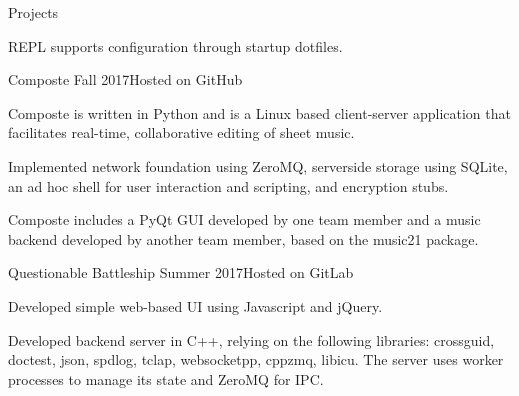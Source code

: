 \documentclass{resume} %
\begin{document}
\begin{rSection}{Projects}
\begin{rSubsection}
\item REPL supports configuration through startup dotfiles.

\end{rSubsection}

\begin{rSubsection}
    {Composte}
    {Fall 2017}{Hosted on GitHub}

\item Composte is written in Python and is a Linux based client-server
    application that facilitates real-time, collaborative editing of sheet
    music.

\item Implemented network foundation using ZeroMQ, serverside storage using
    SQLite, an ad hoc shell for user interaction and scripting, and encryption
    stubs.

\item Composte includes a PyQt GUI developed by one team member and a music
    backend developed by another team member, based on the music21 package.

\end{rSubsection}

\begin{rSubsection}
    {Questionable Battleship}
    {Summer 2017}{Hosted on GitLab}


\item Developed simple web-based UI using Javascript and jQuery.

\item Developed backend server in C++, relying on the following libraries:
    crossguid, doctest, json, spdlog, tclap, websocketpp, cppzmq,
    libicu. The server uses worker processes to manage its state and ZeroMQ
    for IPC.

\end{rSubsection}






\end{rSection}
\end{document}
